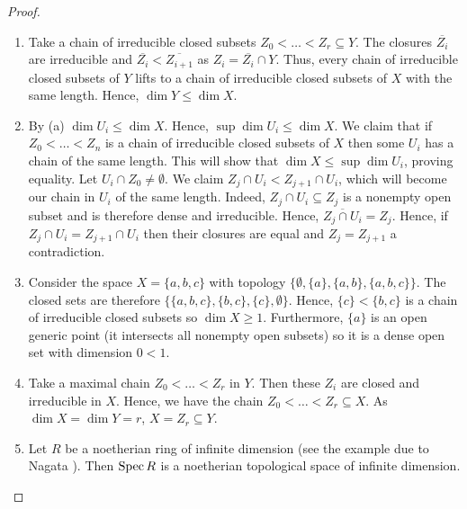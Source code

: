 \begin{proof}
    \begin{enumerate}[label = (\alph*)]
        \item Take a chain of irreducible closed subsets $Z_0 < \dots < Z_r \subseteq Y$. The closures $\overline{Z_i}$ are irreducible and $\overline{Z_i} < \overline{Z_{i + 1}}$ as $Z_i = \overline{Z_i} \cap Y$. Thus, every chain of irreducible closed subsets of $Y$ lifts to a chain of irreducible closed subsets of $X$ with the same length. Hence, $\dim Y \leq \dim X$.
        
        \item By (a) $\dim U_i \leq \dim X$. Hence, $\sup \dim U_i \leq \dim X$. We claim that if $Z_0 < \dots < Z_n$ is a chain of irreducible closed subsets of $X$ then some $U_i$ has a chain of the same length. This will show that $\dim X \leq \sup \dim U_i$, proving equality. Let $U_i \cap Z_0 \neq \emptyset$. We claim $Z_j \cap U_i < Z_{j + 1} \cap U_i$, which will become our chain in $U_i$ of the same length. Indeed, $Z_j \cap U_i \subseteq Z_j$ is a nonempty open subset and is therefore dense and irreducible. Hence, $\overline{Z_j \cap U_i} = Z_j$. Hence, if $Z_j \cap U_i = Z_{j + 1} \cap U_i$ then their closures are equal and $Z_j = Z_{j + 1}$ a contradiction.
        
        \item Consider the space $X = \{a, b, c\}$ with topology $\{\emptyset, \{a\}, \{a, b\}, \{a, b, c\}\}$. The closed sets are therefore $\{\{a, b, c\}, \{b, c\}, \{c\}, \emptyset\}$. Hence, $\{c\} < \{b, c\}$ is a chain of irreducible closed subsets so $\dim X \geq 1$. Furthermore, $\{a\}$ is an open generic point (it intersects all nonempty open subsets) so it is a dense open set with dimension $0 < 1$.
        \item Take a maximal chain $Z_0 < \dots < Z_r$ in $Y$. Then these $Z_i$ are closed and irreducible in $X$. Hence, we have the chain $Z_0 < \dots < Z_r \subseteq X$. As $\dim X = \dim Y = r$, $X = Z_r \subseteq Y$.
        
        \item Let $R$ be a noetherian ring of infinite dimension (see the example due to Nagata \cite[\href{https://stacks.math.columbia.edu/tag/02JC}{02JC}]{stacks}). Then $\operatorname{Spec} R$ is a noetherian topological space of infinite dimension.
    \end{enumerate}
\end{proof}